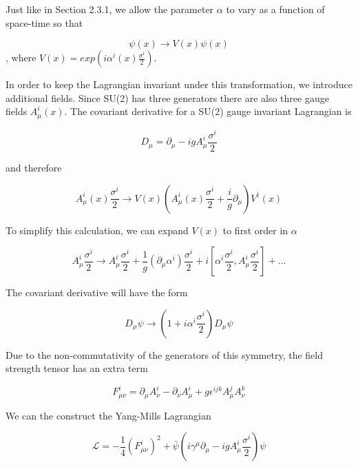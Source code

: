 Just like in Section 2.3.1, we allow the parameter $\alpha$ to vary as a function of space-time so that

\begin{equation}
\psi(x)\rightarrow V(x)\psi(x)
\end{equation}
, where $V(x)= exp(i\alpha^{i}(x)\frac{\sigma^{i}}{2})$.

In order to keep the Lagrangian invariant under this transformation, we introduce additional fields. Since SU(2) has three generators there are also three gauge fields $A_{\mu}^{i}(x)$. The covariant derivative for a SU(2) gauge invariant Lagrangian is

\begin{equation}
\label{su2cod}
D_{\mu} = \partial_{\mu} - igA_{\mu}^{i}\frac{\sigma^{i}}{2}
\end{equation}

and therefore

\begin{equation}
A_{\mu}^{i}(x)\frac{\sigma^{i}}{2}\rightarrow V(x)(A_{\mu}^{i}(x)\frac{\sigma^{i}}{2}+\frac{i}{g}\partial_{\mu})V^{\dagger}(x)
\end{equation}

To simplify this calculation, we can expand $V(x)$ to first order in $\alpha$ 

\begin{equation}
A_{\mu}^{i}\frac{\sigma^{i}}{2}\rightarrow A_{\mu}^{i}\frac{\sigma^{i}}{2} + \frac{1}{g}(\partial_{\mu}\alpha^{i})\frac{\sigma^{i}}{2} + i[\alpha^{i}\frac{\sigma^{i}}{2}, A_{\mu}^{i}\frac{\sigma^{i}}{2}] + ...
\end{equation}

The covariant derivative will have the form

\begin{equation}
D_{\mu}\psi\rightarrow(1+i\alpha^{i}\frac{\sigma^{i}}{2})D_{\mu}\psi
\end{equation}

Due to the non-commutativity of the generators of this symmetry, the field strength tensor has an extra term

\begin{equation}
F_{\mu\nu}^{i} = \partial_{\mu}A_{\nu}^{i} - \partial_{\nu}A_{\mu}^{i} + g\epsilon^{ijk}A_{\mu}^{j}A_{\nu}^{k}
\end{equation}

We can the construct the Yang-Mills Lagrangian

\begin{equation}
\mathcal{L} = -\frac{1}{4}(F_{\mu\nu}^{i})^{2}+\bar{\psi}(i\gamma^{\mu}\partial_{\mu}-igA_{\mu}^{i}\frac{\sigma^{i}}{2})\psi
\end{equation}

